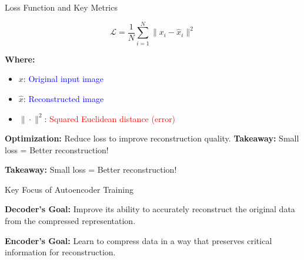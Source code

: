 \documentclass{beamer}
\begin{document}
\begin{frame}{Loss Function and Key Metrics}
    \vspace{-.1cm}
    \begin{tcolorbox}[
        colback=yellow!10!white, 
        colframe=orange!85!black, 
        sharp corners,
        title=\textbf{Mathematical Equation},
        fonttitle=\bfseries\large,
        width=\textwidth,
        boxrule=0.5mm
    ]
        \[
        \mathcal{L} = \frac{1}{N} \sum_{i=1}^{N} \| x_i - \hat{x}_i \|^2
        \]
    \end{tcolorbox}
    
    \vspace{0.4cm}
    \textbf{Where:}
    \begin{itemize}
        \item \textbf{\( x \)}: \textcolor{blue}{Original input image}
        \item \textbf{\( \hat{x} \)}: \textcolor{blue}{Reconstructed image}
        \item \textbf{\( \| \cdot \|^2 \)}: \textcolor{red}{Squared Euclidean distance (error)}
    \end{itemize}

    \vspace{0.3cm}
    \begin{tcolorbox}[
        colback=green!5!white, 
        colframe=green!75!black, 
        sharp corners,
        title=\textbf{Key Insight},
        fonttitle=\bfseries\large,
        width=\textwidth,
        boxrule=0.5mm
    ]
        \textbf{\color{purple}Optimization:} Reduce loss to improve reconstruction quality.\newline
        \textbf{\color{purple}Takeaway:} Small loss = Better reconstruction!
    \end{tcolorbox}
    
    \vspace{0.3cm}
    \textbf{\color{blue}Takeaway:} Small loss = Better reconstruction!
\end{frame}

\begin{frame}{Key Focus of Autoencoder Training}
    \begin{tcolorbox}[colback=purple!5!white, colframe=purple!75!black, width=\textwidth, sharp corners=all, boxrule=1mm]
        \textbf{Decoder's Goal:} Improve its ability to accurately reconstruct the original data from the compressed representation.
    \end{tcolorbox}
    \vspace{0.5cm}
    \begin{tcolorbox}[colback=orange!5!white, colframe=orange!75!black, width=\textwidth, sharp corners=all, boxrule=1mm]
        \textbf{Encoder's Goal:} Learn to compress data in a way that preserves critical information for reconstruction.
    \end{tcolorbox}
\end{frame}
\end{document}
